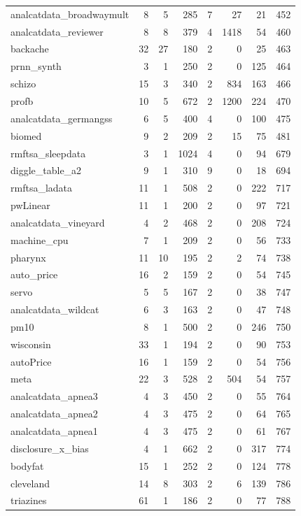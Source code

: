\begin{tabular}{@{\hskip 0mm}l@{\hskip 0mm}rrrrrrr}
 analcatdata\_broadwaymult & 8 & 5 & 285 & 7 & 27 & 21 & 452 \\
 analcatdata\_reviewer & 8 & 8 & 379 & 4 & 1418 & 54 & 460 \\
 backache & 32 & 27 & 180 & 2 & 0 & 25 & 463 \\
 prnn\_synth & 3 & 1 & 250 & 2 & 0 & 125 & 464 \\
 schizo & 15 & 3 & 340 & 2 & 834 & 163 & 466 \\
 profb & 10 & 5 & 672 & 2 & 1200 & 224 & 470 \\
 analcatdata\_germangss & 6 & 5 & 400 & 4 & 0 & 100 & 475 \\
 biomed & 9 & 2 & 209 & 2 & 15 & 75 & 481 \\
 rmftsa\_sleepdata & 3 & 1 & 1024 & 4 & 0 & 94 & 679 \\
 diggle\_table\_a2 & 9 & 1 & 310 & 9 & 0 & 18 & 694 \\
 rmftsa\_ladata & 11 & 1 & 508 & 2 & 0 & 222 & 717 \\
 pwLinear & 11 & 1 & 200 & 2 & 0 & 97 & 721 \\
 analcatdata\_vineyard & 4 & 2 & 468 & 2 & 0 & 208 & 724 \\
 machine\_cpu & 7 & 1 & 209 & 2 & 0 & 56 & 733 \\
 pharynx & 11 & 10 & 195 & 2 & 2 & 74 & 738 \\
 auto\_price & 16 & 2 & 159 & 2 & 0 & 54 & 745 \\
 servo & 5 & 5 & 167 & 2 & 0 & 38 & 747 \\
 analcatdata\_wildcat & 6 & 3 & 163 & 2 & 0 & 47 & 748 \\
 pm10 & 8 & 1 & 500 & 2 & 0 & 246 & 750 \\
 wisconsin & 33 & 1 & 194 & 2 & 0 & 90 & 753 \\
 autoPrice & 16 & 1 & 159 & 2 & 0 & 54 & 756 \\
 meta & 22 & 3 & 528 & 2 & 504 & 54 & 757 \\
 analcatdata\_apnea3 & 4 & 3 & 450 & 2 & 0 & 55 & 764 \\
 analcatdata\_apnea2 & 4 & 3 & 475 & 2 & 0 & 64 & 765 \\
 analcatdata\_apnea1 & 4 & 3 & 475 & 2 & 0 & 61 & 767 \\
 disclosure\_x\_bias & 4 & 1 & 662 & 2 & 0 & 317 & 774 \\
 bodyfat & 15 & 1 & 252 & 2 & 0 & 124 & 778 \\
 cleveland & 14 & 8 & 303 & 2 & 6 & 139 & 786 \\
 triazines & 61 & 1 & 186 & 2 & 0 & 77 & 788 \\

\end{tabular}
